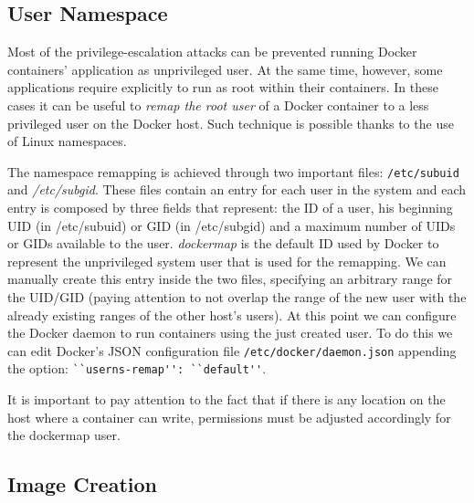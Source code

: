 \documentclass[a4paper,12pt]{article}
\newcommand{\file}[1]{\texttt{#1}\xspace}
\newcommand{\code}[1]{\lstinline|#1|}
\begin{document}
\subsection{User Namespace}

Most of the privilege-escalation attacks can be prevented running Docker
containers' application as unprivileged user. At the same time, however, some
applications require explicitly to run as root within their containers. In these
cases it can be useful to \textit{remap the root user} \cite{isolate_namespace}
of a Docker container to a less privileged user on the Docker host. Such
technique is possible thanks to the use of Linux namespaces. \par The namespace
remapping is achieved through two important files: \file{/etc/subuid} and
\textit{/etc/subgid}. These files contain an entry for each user in the system
and each entry is composed by three fields that represent: the ID of a user, his
beginning UID (in /etc/subuid) or GID (in /etc/subgid) and a maximum number of
UIDs or GIDs available to the user. \textit{dockermap} is the default ID used by
Docker to represent the unprivileged system user that is used for the remapping.
We can manually create this entry inside the two files, specifying an arbitrary
range for the UID/GID (paying attention to not overlap the range of the new user
with the already existing ranges of the other host's users). At this point we
can configure the Docker daemon to run containers using the just created user.
To do this we can edit Docker's JSON configuration file
\file{/etc/docker/daemon.json} appending the option: \code{``userns-remap'':
``default''}. \par It is important to pay attention to the fact that if there is any
location on the host where a container can write, permissions must be
adjusted accordingly for the dockermap user. 

\subsection{Image Creation}
\end{document}
